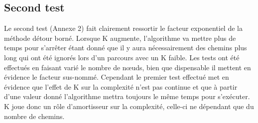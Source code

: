 \subsection{Second test}
Le second test (Annexe 2) fait clairement ressortir le facteur exponentiel de la méthode détour borné. Lorsque K augmente, l'algorithme va mettre plus de temps pour s'arrêter étant donné que il y aura nécessairement des chemins plus long qui ont été ignorés lors d'un parcours avec un K faible. Les tests ont été effectués en faisant varié le nombre de nœuds, bien que dispensable il mettent en évidence le facteur sus-nommé. Cependant le premier test effectué met en évidence que l'effet de K sur la complexité n'est pas continue et que à partir d'une valeur donné l'algorithme mettra toujours le même temps pour s'exécuter. K joue donc un rôle d'amortisseur sur la complexité, celle-ci ne dépendant que du nombre de chemins.


